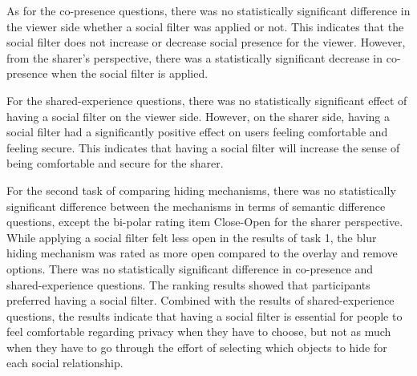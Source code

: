 As for the co-presence questions, there was no statistically significant difference in the viewer side whether a social filter was applied or not. This indicates that the social filter does not increase or decrease social presence for the viewer. However, from the sharer's perspective, there was a statistically significant decrease in co-presence when the social filter is applied. 

For the shared-experience questions, there was no statistically significant effect of having a social filter on the viewer side. However, on the sharer side, having a social filter had a significantly positive effect on users feeling comfortable and feeling secure. This indicates that having a social filter will increase the sense of being comfortable and secure for the sharer. 

For the second task of comparing hiding mechanisms, there was no statistically significant difference between the mechanisms in terms of semantic difference questions, except the bi-polar rating item Close-Open for the sharer perspective. While applying a social filter felt less open in the results of task 1, the blur hiding mechanism was rated as more open compared to the overlay and remove options. There was no statistically significant difference in co-presence and shared-experience questions. 
The ranking results showed that participants preferred having a social filter. Combined with the results of shared-experience questions, the results indicate that having a social filter is essential for people to feel comfortable regarding privacy when they have to choose, but not as much when they have to go through the effort of selecting which objects to hide for each social relationship. 


